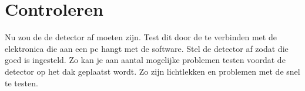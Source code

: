 \section{Controleren}

Nu zou de de detector af moeten zijn. Test dit door de \pmt te verbinden
met de \hisparc elektronica die aan een pc hangt met de \hisparc
software. Stel de detector af zodat die goed is ingesteld. Zo kan je aan
aantal mogelijke problemen testen voordat de detector op het dak
geplaatst wordt. Zo zijn lichtlekken en problemen met de \pmt snel te
testen.



